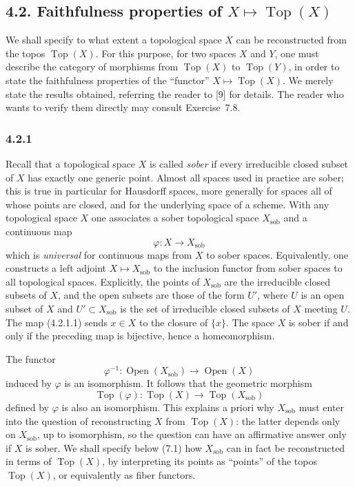 \documentclass[11pt]{article}
\newcommand{\Top}{\operatorname{Top}}
\newcommand{\Open}{\operatorname{Open}}
\newcommand{\sob}{\operatorname{sob}}
\begin{document}
\subsection*{4.2. Faithfulness properties of \(X\mapsto\Top(X)\)}
We shall specify to what extent a topological space \(X\) can be reconstructed from the topos \(\Top(X)\). For this purpose, for two spaces \(X\) and \(Y\), one must describe the category of morphisms from \(\Top(X)\) to \(\Top(Y)\), in order to state the faithfulness properties of the ``functor'' \(X\mapsto\Top(X)\). We merely state the results obtained, referring the reader to [9] for details. The reader who wants to verify them directly may consult Exercise~7.8.

\subsubsection*{4.2.1}
Recall that a topological space \(X\) is called \emph{sober} if every irreducible closed subset of \(X\) has exactly one generic point. Almost all spaces used in practice are sober; this is true in particular for Hausdorff spaces, more generally for spaces all of whose points are closed, and for the underlying space of a scheme. With any topological space \(X\) one associates a sober topological space \(X_{\sob}\) and a continuous map
\[
\varphi:X\longrightarrow X_{\sob}\tag{4.2.1.1}
\]
which is \emph{universal} for continuous maps from \(X\) to sober spaces. Equivalently, one constructs a left adjoint \(X\mapsto X_{\sob}\) to the inclusion functor from sober spaces to all topological spaces. Explicitly, the points of \(X_{\sob}\) are the irreducible closed subsets of \(X\), and the open subsets are those of the form \(U'\), where \(U\) is an open subset of \(X\) and \(U'\subset X_{\sob}\) is the set of irreducible closed subsets of \(X\) meeting \(U\). The map (4.2.1.1) sends \(x\in X\) to the closure of \(\{x\}\). The space \(X\) is sober if and only if the preceding map is bijective, hence a homeomorphism.

The functor
\[
\varphi^{-1}:\Open(X_{\sob})\longrightarrow\Open(X)
\]
induced by \(\varphi\) is an isomorphism. It follows that the geometric morphism
\[
\Top(\varphi):\Top(X)\longrightarrow\Top(X_{\sob})
\]
defined by \(\varphi\) is also an isomorphism. This explains a priori why \(X_{\sob}\) must enter into the question of reconstructing \(X\) from \(\Top(X)\): the latter depends only on \(X_{\sob}\), up to isomorphism, so the question can have an affirmative answer only if \(X\) is sober. We shall specify below (7.1) how \(X_{\sob}\) can in fact be reconstructed in terms of \(\Top(X)\), by interpreting its points as ``points'' of the topos \(\Top(X)\), or equivalently as fiber functors.
\end{document}

